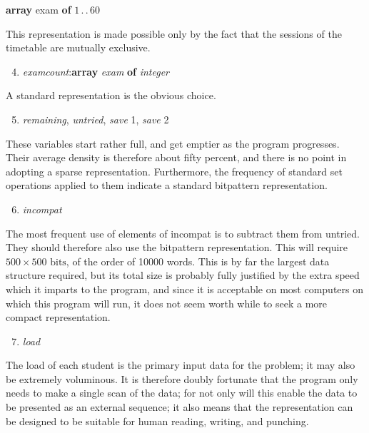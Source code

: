 \quad \textbf{array} exam \textbf{of} $1\,.\,.\,60$

\noindent
This representation is made possible only by the fact that the sessions of the timetable are mutually exclusive.

\begin{enumerate}[leftmargin=2\parindent, label=(\arabic*)]
	\setcounter{enumi}{3}
	\item \textit{examcount}:\textbf{array} \textit{exam} \textbf{of} \textit{integer}
\end{enumerate}

\noindent
A standard representation is the obvious choice.

\begin{enumerate}[leftmargin=2\parindent, label=(\arabic*)]
	\setcounter{enumi}{4}
	\item \textit{remaining}, \textit{untried}, \textit{save} 1, \textit{save} 2
\end{enumerate}

\noindent
These variables start rather full, and get emptier as the program progresses.
Their average density is therefore about fifty percent, and there is no point
in adopting a sparse representation. Furthermore, the frequency of standard
set operations applied to them indicate a standard bitpattern representation.

\begin{enumerate}[leftmargin=2\parindent, label=(\arabic*)]
	\setcounter{enumi}{5}
	\item \textit{incompat}
\end{enumerate}

\noindent
The most frequent use of elements of incompat is to subtract them from untried. They should therefore also use the bitpattern representation. This will require $500 \times 500 \text{ bits}$, of the order of 10000 words. This is by far the largest data structure required, but its total size is probably fully justified by the extra speed which it imparts to the program, and since it is acceptable on most computers on which this program will run, it does not seem worth while to seek a more compact representation.

\begin{enumerate}[leftmargin=2\parindent, label=(\arabic*)]
	\setcounter{enumi}{6}
	\item \textit{load}
\end{enumerate}

\noindent
The load of each student is the primary input data for the problem; it may also be extremely voluminous. It is therefore doubly fortunate that the program only needs to make a single scan of the data; for not only will this enable the data to be presented as an external sequence; it also means that the representation can be designed to be suitable for human reading, writing, and punching.

